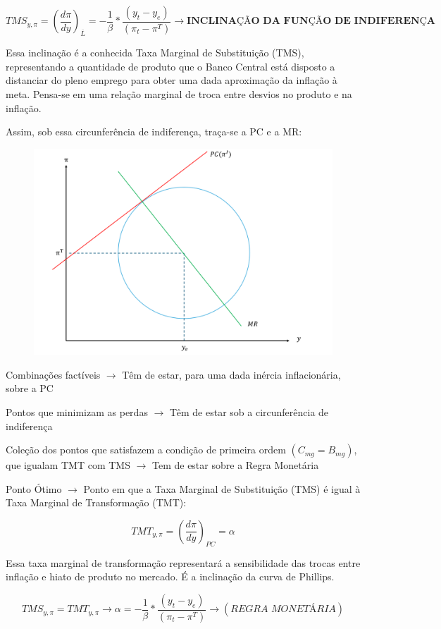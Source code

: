 \documentclass[a4paper,12pt]{article}[abntex2]
\begin{document}
\[
TMS_{y,\pi} = \left(\frac{d\pi}{dy}\right)_{\bar{L}} = -\frac{1}{\beta} * \frac{(y_t - y_e)}{(\pi_t - \pi^T)} \rightarrow \textbf{INCLINAÇÃO DA FUNÇÃO DE INDIFERENÇA}
\]

Essa inclinação é a conhecida Taxa Marginal de Substituição (TMS), representando a quantidade de produto que o Banco Central está disposto a distanciar do pleno emprego para obter uma dada aproximação da inflação à meta. Pensa-se em uma relação marginal de troca entre desvios no produto e na inflação.

Assim, sob essa circunferência de indiferença, traça-se a PC e a MR:

\begin{figure}[H]
    \centering
    \includegraphics[width=0.7\linewidth]{Imagens/a15i3.png}
\end{figure}

Combinações factíveis \(\rightarrow\) Têm de estar, para uma dada inércia inflacionária, sobre a PC

Pontos que minimizam as perdas \(\rightarrow\) Têm de estar sob a circunferência de indiferença

Coleção dos pontos que satisfazem a condição de primeira ordem \((C_{mg} = B_{mg})\), que igualam TMT com TMS \(\rightarrow\) Tem de estar sobre a Regra Monetária

Ponto Ótimo \(\rightarrow\) Ponto em que a Taxa Marginal de Substituição (TMS) é igual à Taxa Marginal de Transformação (TMT):

\[
TMT_{y,\pi} = \left(\frac{d\pi}{dy}\right)_{PC} = \alpha
\]

Essa taxa marginal de transformação representará a sensibilidade das trocas entre inflação e hiato de produto no mercado. É a inclinação da curva de Phillips.

\[
TMS_{y,\pi} = TMT_{y,\pi} \rightarrow \alpha = -\frac{1}{\beta} * \frac{(y_t - y_e)}{(\pi_t - \pi^T)} \rightarrow (\textit{REGRA MONETÁRIA})
\]
\end{document}
